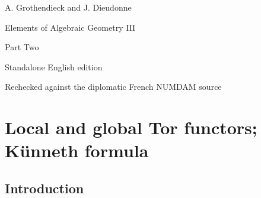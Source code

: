 \documentclass[10pt,oneside]{book}
\newcommand{\oldpage}[2][]{\setcounter{footnote}{0}\marginpar{\scriptsize\textbf{#1}~|~#2}\ignorespaces}
\begin{document}
\begin{titlepage}
  \centering
  {\Large A. Grothendieck and J. Dieudonne\par}
  \vfill
  {\Huge Elements of Algebraic Geometry III\par}
  \vspace{1.5ex}
  {\LARGE Part Two\par}
  \vfill
  {\large Standalone English edition\par}
  \vspace{1ex}
  {\small Rechecked against the diplomatic French NUMDAM source\par}
\end{titlepage}

\setcounter{section}{5}
\setcounter{subsection}{0}
\setcounter{equation}{0}
\setcounter{footnote}{0}
\section{Local and global Tor functors; K\"unneth formula}
\label{section:III.6}


\subsection{Introduction}
\label{subsection:III.6.1}

\oldpage[III]{137}
\end{document}
